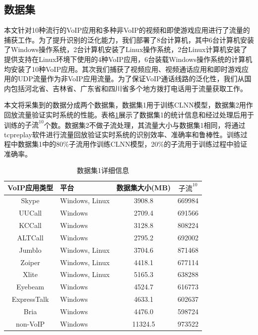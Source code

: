\subsection{数据集}
本文针对10种流行的VoIP应用和多种非VoIP的视频和即使游戏应用进行了流量的捕获工作。为了提升识别的泛化能力，我们部署了8台计算机，其中6台计算机安装了Windows操作系统，2台计算机安装了Linux操作系统，2台Linux计算机安装了提供支持在Linux环境下使用的4种VoIP应用，6台装载Windows操作系统的计算机均安装了10种VoIP应用。其次我们捕获了视频应用、视频通话应用和即时游戏应用的UDP流量作为非VoIP应用流量。为了保证VoIP通话线路的泛化性，我们从国内包括河北省、吉林省、广东省和四川省多个地方拨打电话用于流量获取工作。

本文将采集到的数据分成两个数据集，数据集1用于训练CLNN模型，数据集2用作回放流量验证实时系统的性能。表格\ref{tab:traffic}展示了数据集1的统计信息和经过处理后用于训练的$\text{子流}^{10}$个数。数据集2不做子流处理，其流量大小与数据集1相同，将通过tcpreplay软件进行流量回放验证实时系统的识别效率、准确率和鲁棒性。训练过程中数据集1中的80\%子流用作训练CLNN模型，20\%的子流用于训练过程中验证准确率。

\begin{table}[htbp]
  \caption{数据集1详细信息}
  \label{tab:traffic}
  \centering
  \begin{tabular}{c l c c}
    \hline
    \textbf{VoIP应用类型} & \textbf{平台} & \textbf{数据集大小(MB)}& \textbf{$\text{子流}^{10}$}\\
    \hline
    Skype      & Windows, Linux  & 3908.8  &  669984  \\
    UUCall      & Windows  & 2709.4  &  691566  \\
    KCCall      & Windows  & 3128.8  &  808224  \\
    ALTCall      & Windows  & 2795.2  &  692002  \\
    Jumblo      & Windows, Linux  & 3704.6  &  871468  \\
    Zoiper      & Windows, Linux  & 4418.1  &  677114  \\
    Xlite      & Windows, Linux  & 5165.3  &  638288  \\
    Eyebeam      & Windows  & 4524.7  &  616773  \\
    ExpressTalk      & Windows  & 4633.1  &  602637  \\
    Bria      & Windows  & 4476.0  &  598724  \\
    non-VoIP      & Windows  & 11324.5  &  973522  \\
    \hline
  \end{tabular}
\end{table}

